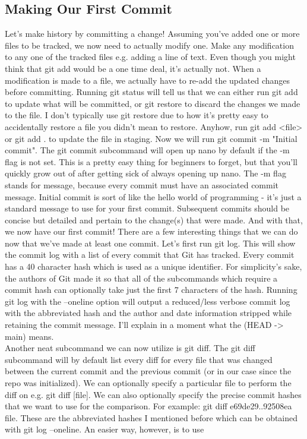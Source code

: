 \documentclass{article}
\begin{document}
\subsection{Making Our First Commit}

Let's make history by committing a change! Assuming you've added one or more files to be tracked, we now need 
to actually modify one. Make any modification to any one of the tracked files e.g. adding a line of text. 
Even though you might think that git add would be a one time deal, it's actually not. When a modification is 
made to a file, we actually have to re-add the updated changes before committing. Running git status will 
tell us that we can either run git add to update what will be committed, or git restore to discard the changes 
we made to the file. I don't typically use git restore due to how it's pretty easy to accidentally restore a 
file you didn't mean to restore. Anyhow, run git add <file> or git add . to update the file in staging. Now 
we will run git commit -m "Initial commit". The git commit subcommand will open up nano by default if the -m 
flag is not set. This is a pretty easy thing for beginners to forget, but that you'll quickly grow out of 
after getting sick of always opening up nano. The -m flag stands for message, because every commit must have 
an associated commit message. Initial commit is sort of like the hello world of programming - it's just a 
standard message to use for your first commit. Subsequent commits should be concise but detailed and pertain 
to the change(s) that were made. And with that, we now have our first commit! There are a few interesting 
things that we can do now that we've made at least one commit. Let's first run git log. This will show the 
commit log with a list of every commit that Git has tracked. Every commit has a 40 character hash which is 
used as a unique identifier. For simplicity's sake, the authors of Git made it so that all of the subcommands 
which require a commit hash can optionally take just the first 7 characters of the hash. Running git log with 
the --oneline option will output a reduced/less verbose commit log with the abbreviated hash and the author and 
date information stripped while retaining the commit message. I'll explain in a moment what the (HEAD -> main) 
means.\\

Another neat subcommand we can now utilize is git diff. The git diff subcommand will by default list every diff 
for every file that was changed between the current commit and the previous commit (or in our case since the 
repo was initialized). We can optionally specify a particular file to perform the diff on e.g. git diff [file].
We can also optionally specify the precise commit hashes that we want to use for the comparison. For example: 
git diff e69de29..92508ea file. These are the abbreviated hashes I mentioned before which can be obtained with 
git log --oneline. An easier way, however, is to use 
\end{document}
